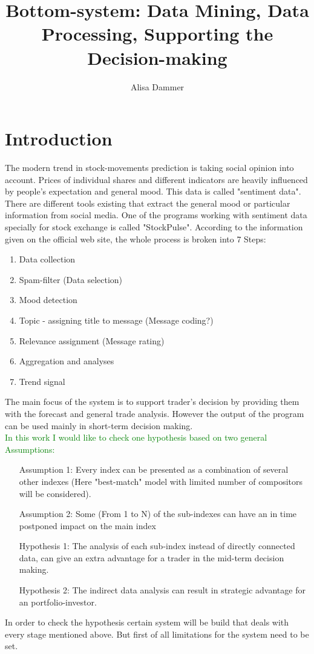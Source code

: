 \documentclass[11pt]{article}
\title{\textbf{Bottom-system: Data Mining, Data Processing, Supporting the Decision-making}}
\author{Alisa Dammer}
\begin{document}
\maketitle

\section{Introduction}
The modern trend in stock-movements prediction is taking social opinion into account. Prices of individual shares and different indicators are heavily influenced by people's expectation and general mood. This data is called "sentiment data". There are different tools existing that extract the general mood or particular information from social media.
One of the programs working with sentiment data specially for stock exchange is called "StockPulse". According to the information given on the official web site, the whole process is broken into 7 Steps:\\
\begin{enumerate}
	\item Data collection
	\item Spam-filter (Data selection)
	\item Mood detection
	\item Topic - assigning title to message (Message coding?)
	\item Relevance assignment (Message rating)
	\item Aggregation and analyses
	\item Trend signal
\end{enumerate}
The main focus of the system is to support trader's decision by providing them with the forecast and general trade analysis. However the output of the program can be used mainly in short-term decision making.\\
\textcolor{green}{In this work I would like to check one hypothesis based on two general Assumptions: }
\begin{enumerate}

	\item[Assumption 1:] Every index can be presented as a combination of several other indexes (Here "best-match" model with limited number of compositors will be considered).
	\item[Assumption 2:] Some (From 1 to N) of the sub-indexes can have an in time postponed impact on the main index 
	\item[Hypothesis 1:] The analysis of each sub-index instead of directly connected data, can give an extra advantage for a trader in the mid-term decision making.
	\item[Hypothesis 2:] The indirect data analysis can result in strategic advantage for an portfolio-investor.
\end{enumerate}
In order to check the hypothesis certain system will be build that deals with every stage mentioned above. But first of all limitations for the system need to be set.\\
\end{document}
